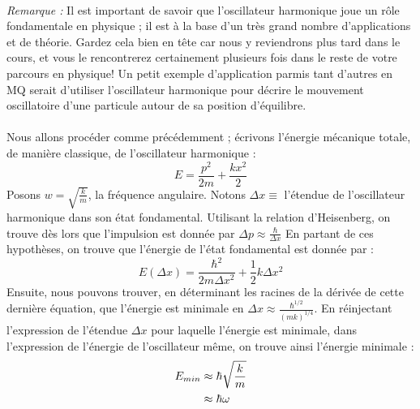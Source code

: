 \documentclass[../Notes de cours]{subfiles}
\begin{document}
\paragraph{} \textit{Remarque :} Il est important de savoir que l'oscillateur harmonique joue un rôle fondamentale en physique ; il est à la base d'un très grand nombre d'applications et de théorie. Gardez cela bien en tête car nous y reviendrons plus tard dans le cours, et vous le rencontrerez certainement plusieurs fois dans le reste de votre parcours en physique!
\newline Un petit exemple d'application parmis tant d'autres en MQ serait d'utiliser l'oscillateur harmonique pour décrire le mouvement oscillatoire d'une particule autour de sa position d'équilibre. 

\paragraph{} Nous allons procéder comme précédemment ; écrivons l'énergie mécanique totale, de manière classique, de l'oscillateur harmonique : \begin{equation}
    \label{Energie OHC}
    E = \frac{p^2}{2m} + \frac{kx^2}{2}
\end{equation}
Posons $w = \sqrt{\frac{k}{m}}$, la fréquence angulaire. 
\newline Notons $\Delta x \equiv$ l'étendue de l'oscillateur harmonique dans son état fondamental. 
\newline Utilisant la relation d'Heisenberg, on trouve dès lors que 
\newline l'impulsion est donnée par $\Delta p \approx \frac{\hbar}{\Delta x}$
\newline En partant de ces hypothèses, on trouve que l'énergie de l'état fondamental est donnée par : 
\begin{equation}
E \left(\Delta x \right) = \frac{\hbar^2}{2m\Delta x^2} + \frac{1}{2} k \Delta x^2
\end{equation}
Ensuite, nous pouvons trouver, en déterminant les racines de la dérivée de cette dernière équation, que l'énergie est minimale en $\Delta x \approx \frac{\hbar^{1/2}}{\left(mk\right)^{1/4}}$. 
En réinjectant l'expression de l'étendue $\Delta x$ pour laquelle l'énergie est minimale, dans l'expression de l'énergie de l'oscillateur même, on trouve ainsi l'énergie minimale : 
\begin{align}
\label{Energie OH}
E_{min} &\approx \hbar \sqrt{\frac{k}{m}} \notag \\
& \approx \hbar \omega 
\end{align}
\end{document}

